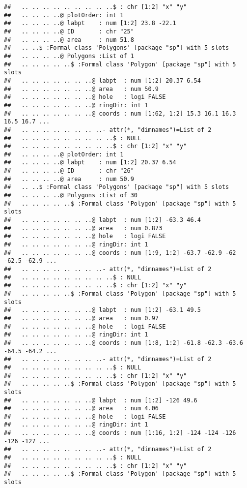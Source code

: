 \documentclass[]{article}
\begin{document}
\begin{verbatim}
##   .. .. .. .. .. .. .. .. ..$ : chr [1:2] "x" "y"
##   .. .. .. ..@ plotOrder: int 1
##   .. .. .. ..@ labpt    : num [1:2] 23.8 -22.1
##   .. .. .. ..@ ID       : chr "25"
##   .. .. .. ..@ area     : num 51.8
##   .. ..$ :Formal class 'Polygons' [package "sp"] with 5 slots
##   .. .. .. ..@ Polygons :List of 1
##   .. .. .. .. ..$ :Formal class 'Polygon' [package "sp"] with 5 slots
##   .. .. .. .. .. .. ..@ labpt  : num [1:2] 20.37 6.54
##   .. .. .. .. .. .. ..@ area   : num 50.9
##   .. .. .. .. .. .. ..@ hole   : logi FALSE
##   .. .. .. .. .. .. ..@ ringDir: int 1
##   .. .. .. .. .. .. ..@ coords : num [1:62, 1:2] 15.3 16.1 16.3 16.5 16.7 ...
##   .. .. .. .. .. .. .. ..- attr(*, "dimnames")=List of 2
##   .. .. .. .. .. .. .. .. ..$ : NULL
##   .. .. .. .. .. .. .. .. ..$ : chr [1:2] "x" "y"
##   .. .. .. ..@ plotOrder: int 1
##   .. .. .. ..@ labpt    : num [1:2] 20.37 6.54
##   .. .. .. ..@ ID       : chr "26"
##   .. .. .. ..@ area     : num 50.9
##   .. ..$ :Formal class 'Polygons' [package "sp"] with 5 slots
##   .. .. .. ..@ Polygons :List of 30
##   .. .. .. .. ..$ :Formal class 'Polygon' [package "sp"] with 5 slots
##   .. .. .. .. .. .. ..@ labpt  : num [1:2] -63.3 46.4
##   .. .. .. .. .. .. ..@ area   : num 0.873
##   .. .. .. .. .. .. ..@ hole   : logi FALSE
##   .. .. .. .. .. .. ..@ ringDir: int 1
##   .. .. .. .. .. .. ..@ coords : num [1:9, 1:2] -63.7 -62.9 -62 -62.5 -62.9 ...
##   .. .. .. .. .. .. .. ..- attr(*, "dimnames")=List of 2
##   .. .. .. .. .. .. .. .. ..$ : NULL
##   .. .. .. .. .. .. .. .. ..$ : chr [1:2] "x" "y"
##   .. .. .. .. ..$ :Formal class 'Polygon' [package "sp"] with 5 slots
##   .. .. .. .. .. .. ..@ labpt  : num [1:2] -63.1 49.5
##   .. .. .. .. .. .. ..@ area   : num 0.97
##   .. .. .. .. .. .. ..@ hole   : logi FALSE
##   .. .. .. .. .. .. ..@ ringDir: int 1
##   .. .. .. .. .. .. ..@ coords : num [1:8, 1:2] -61.8 -62.3 -63.6 -64.5 -64.2 ...
##   .. .. .. .. .. .. .. ..- attr(*, "dimnames")=List of 2
##   .. .. .. .. .. .. .. .. ..$ : NULL
##   .. .. .. .. .. .. .. .. ..$ : chr [1:2] "x" "y"
##   .. .. .. .. ..$ :Formal class 'Polygon' [package "sp"] with 5 slots
##   .. .. .. .. .. .. ..@ labpt  : num [1:2] -126 49.6
##   .. .. .. .. .. .. ..@ area   : num 4.06
##   .. .. .. .. .. .. ..@ hole   : logi FALSE
##   .. .. .. .. .. .. ..@ ringDir: int 1
##   .. .. .. .. .. .. ..@ coords : num [1:16, 1:2] -124 -124 -126 -126 -127 ...
##   .. .. .. .. .. .. .. ..- attr(*, "dimnames")=List of 2
##   .. .. .. .. .. .. .. .. ..$ : NULL
##   .. .. .. .. .. .. .. .. ..$ : chr [1:2] "x" "y"
##   .. .. .. .. ..$ :Formal class 'Polygon' [package "sp"] with 5 slots

\end{verbatim}
\end{document}
